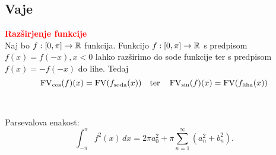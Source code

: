 \documentclass[a4paper,oneside,8pt,landscape]{extarticle}
\begin{document}
\begin{multicols*}{3}
\subsection*{Vaje}
\textbf{\textcolor{red}{Razširjenje funkcije}}\\
Naj bo \(f: [0, \pi] \to \mathbb{R}\) funkcija. Funkcijo \(f: [0, \pi] \to \mathbb{R}\) s predpisom \(f(x) = f(-x), x < 0\) lahko razširimo do sode funkcije ter s predpisom \(f(x) = -f(-x)\) do lihe. Tedaj 
\[
    \operatorname{FV}_{\cos}(f)(x) = \operatorname{FV}(f_{\text{soda}}(x)) \quad \text{ter} \quad \operatorname{FV}_{\sin}(f)(x) = \text{FV}(f_{\text{liha}}(x))
\]

\

Parsevalova enakost:
\[
    \int_{-\pi}^{\pi} f^2(x) \, dx = 2\pi a_0^2 + \pi \sum_{n=1}^{\infty} (a_n^2 + b_n^2).
\]

\end{multicols*}
\end{document}
